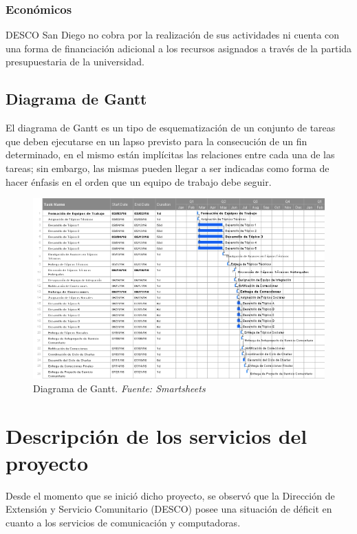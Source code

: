 \documentclass[11pt, a4paper, twosides]{report}
\begin{document}
\subsection{Económicos}
 DESCO San Diego no cobra por la realización de sus actividades ni cuenta con una forma de financiación adicional a los recursos asignados a través de la partida presupuestaria de la universidad.
 
 \newpage
\section{Diagrama de Gantt}
 El diagrama de Gantt es un tipo de esquematización de un conjunto de tareas que deben ejecutarse en un lapso previsto para la consecución de un fin determinado, en el mismo están implícitas las relaciones entre cada una de las tareas; sin embargo, las mismas pueden llegar a ser indicadas como forma de hacer énfasis en el orden que un equipo de trabajo debe seguir.\\

 \begin{figure}[H]
 	\centering
 	\includegraphics[width=1\textwidth,angle=270]{fig3}
 	\caption{Diagrama de Gantt. \textit{Fuente: Smartsheets}}
 \end{figure}
 
\chapter{Descripción de los servicios del\\ proyecto}
Desde el momento que se inició dicho proyecto, se observó que la Dirección de Extensión y Servicio Comunitario (DESCO) posee una situación de déficit en cuanto a los servicios de comunicación y computadoras.
\end{document}
